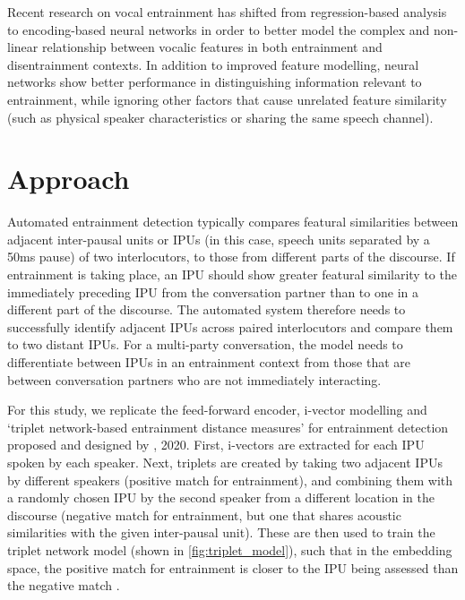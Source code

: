     Recent research on vocal entrainment has shifted from regression-based analysis to encoding-based neural networks in order to better model the complex and non-linear relationship between vocalic features in both entrainment and disentrainment contexts. In addition to improved feature modelling, neural networks show better performance in distinguishing information relevant to entrainment, while ignoring other factors that cause unrelated feature similarity (such as physical speaker characteristics or sharing the same speech channel)\parencite{nasir2020}.

\section{Approach}

    Automated entrainment detection typically compares featural similarities between adjacent inter-pausal units or IPUs (in this case, speech units separated by a 50ms pause) of two interlocutors, to those from different parts of the discourse. If entrainment is taking place, an IPU should show greater featural similarity to the immediately preceding IPU from the conversation partner than to one in a different part of the discourse. The automated system therefore needs to successfully identify adjacent IPUs across paired interlocutors and compare them to two distant IPUs. For a multi-party conversation, the model needs to differentiate between IPUs in an entrainment context from those that are between conversation partners who are not immediately interacting.

    For this study, we replicate the feed-forward encoder, i-vector modelling
    and `triplet network-based entrainment distance measures' for entrainment
    detection proposed and designed by \citeauthor{nasir2020}, 2020. First,
    i-vectors are extracted for each IPU spoken by each speaker. Next, triplets
    are created by taking two adjacent IPUs by different speakers (positive
    match for entrainment), and combining them with a randomly chosen IPU by
    the second speaker from a different location in the discourse (negative
    match for entrainment, but one that shares acoustic similarities with the
    given inter-pausal unit). These are then used to train the triplet network
    model (shown in \ref{fig:triplet_model}), such that in the embedding space,
    the positive match for entrainment is closer to the IPU being assessed than
    the negative match \cite{hoffer2015deep}.


